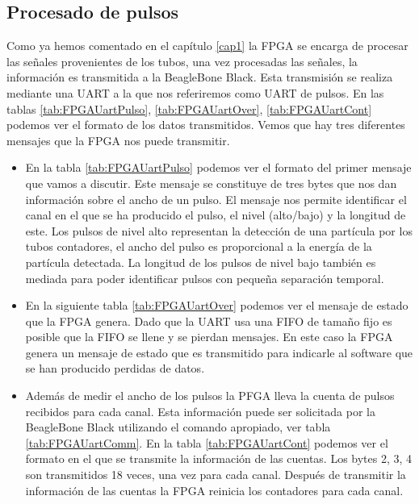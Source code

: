 	\subsection{Procesado de pulsos}
		Como ya hemos comentado en el capítulo \ref{cap1} la FPGA se encarga de procesar las señales provenientes de los tubos, una vez procesadas
		las señales, la información es transmitida a la BeagleBone Black. Esta transmisión se realiza mediante una UART a la que nos referiremos
		como UART de pulsos. En las tablas \ref{tab:FPGAUartPulso}, \ref{tab:FPGAUartOver}, \ref{tab:FPGAUartCont} podemos ver el formato de los
		datos transmitidos. Vemos que hay tres diferentes mensajes que la FPGA nos puede transmitir.
		\begin{itemize}
			\item	En la tabla \ref{tab:FPGAUartPulso} podemos ver el formato del primer mensaje que vamos a discutir. Este mensaje se
			  	constituye de tres bytes que nos dan información sobre el ancho de un pulso. El mensaje nos permite identificar el canal
				en el que se ha producido el pulso, el nivel (alto/bajo) y la longitud de este. Los pulsos de nivel alto representan la
				detección de una partícula por los tubos contadores, el ancho del pulso es proporcional a la energía de la partícula
				detectada. La longitud de los pulsos de nivel bajo también es mediada para poder identificar pulsos con pequeña
				separación temporal.
			\item 	En la siguiente tabla \ref{tab:FPGAUartOver} podemos ver el mensaje de estado que la FPGA genera. Dado que la UART usa
			  	una FIFO de tamaño fijo es posible que la FIFO se llene y se pierdan mensajes. En este caso la FPGA genera un mensaje de
				estado que es transmitido para indicarle al software que se han producido perdidas de datos.
			\item	Además de medir el ancho de los pulsos la PFGA lleva la cuenta de pulsos recibidos para cada canal. Esta información
			  	puede ser solicitada por la BeagleBone Black utilizando el comando apropiado, ver tabla \ref{tab:FPGAUartComm}. En la
				tabla \ref{tab:FPGAUartCont} podemos ver el formato en el que se transmite la información de las cuentas. Los bytes
				2, 3, 4 son transmitidos 18 veces, una vez para cada canal. Después de transmitir la información de las cuentas la FPGA
				reinicia los contadores para cada canal.
		\end{itemize}
